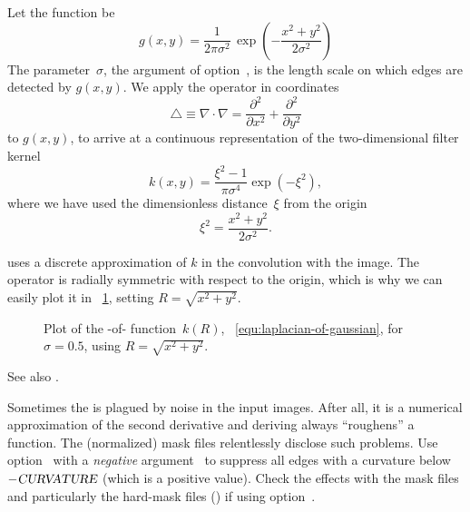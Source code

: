 Let the  function be
\[
    g(x, y) =
    \frac{1}{2 \pi \sigma^2} \,
    {\exp\left(-\frac{x^2 + y^2}{2 \sigma^2}\right)}
\]
\noindent The parameter~$\sigma$, the argument of option~, is the
length scale on which edges are detected by $g(x, y)$.  We apply the 
operator in  coordinates
\[
    \bigtriangleup \equiv \nabla \cdot \nabla =
    \frac{\partial^2}{\partial x^2} + \frac{\partial^2}{\partial y^2}
\]
\noindent to $g(x, y)$, to arrive at a continuous representation of the two-dimensional filter
kernel
\begin{equation}\label{equ:laplacian-of-gaussian}
    k(x, y) = \frac{\xi^2 - 1}{\pi \sigma^4} \exp(-\xi^2),
\end{equation}
\noindent where we have used the dimensionless distance~$\xi$ from the origin
\[
    \xi^2 = \frac{x^2 + y^2}{2 \sigma^2}.
\]

\App{} uses a discrete approximation of $k$ in the convolution with the image.  The operator is
radially symmetric with respect to the origin, which is why we can easily plot it in
\figureName~\ref{fig:laplacian-of-gaussian}, setting $R = \sqrt{x^2 + y^2}$.


\begin{figure}
  \ifreferencemanual\begin{maxipage}\fi
  \centering
  \ifreferencemanual\end{maxipage}\fi

  \caption[-of-]{\label{fig:laplacian-of-gaussian}%
    Plot of the -of- function~$k(R)$,
    \equationabbr~\ref{equ:laplacian-of-gaussian}, for $\sigma = 0.5$, using $R = \sqrt{x^2 +
      y^2}$.}
\end{figure}


\noindent See also .

Sometimes the  is plagued by noise in the input images.  After all, it is a
numerical approximation of the second derivative and deriving always ``roughens'' a function.
The (normalized) mask files relentlessly disclose such problems.  Use
option~ with a \emph{negative} argument~ to
suppress all edges with a curvature below $-\textsl{CURVATURE}$ (which is a positive value).
Check the effects with the mask files and particularly the hard-mask files
() if using option~.

